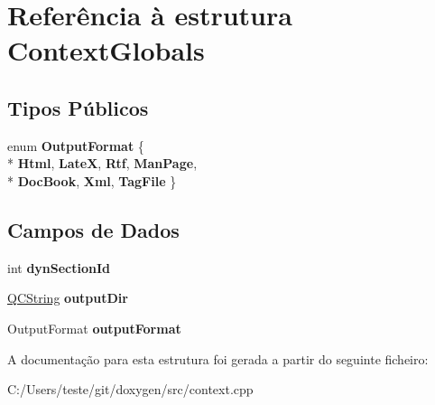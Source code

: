 \hypertarget{struct_context_globals}{\section{Referência à estrutura Context\-Globals}
\label{struct_context_globals}
}
\subsection*{Tipos Públicos}
\begin{DoxyCompactItemize}
\item 
enum {\bfseries Output\-Format} \{ \\*
{\bfseries Html}, 
{\bfseries Late\-X}, 
{\bfseries Rtf}, 
{\bfseries Man\-Page}, 
\\*
{\bfseries Doc\-Book}, 
{\bfseries Xml}, 
{\bfseries Tag\-File}
 \}
\end{DoxyCompactItemize}
\subsection*{Campos de Dados}
\begin{DoxyCompactItemize}
\item 
\hypertarget{struct_context_globals_a7cdd120bf494b891babda8587c098f6a}{int {\bfseries dyn\-Section\-Id}}\label{struct_context_globals_a7cdd120bf494b891babda8587c098f6a}

\item 
\hypertarget{struct_context_globals_a78adf7da3f3f4dd27b43938456bfd94d}{\hyperlink{class_q_c_string}{Q\-C\-String} {\bfseries output\-Dir}}\label{struct_context_globals_a78adf7da3f3f4dd27b43938456bfd94d}

\item 
\hypertarget{struct_context_globals_aaecb56ed832ccc0660e49ea16793fdbd}{Output\-Format {\bfseries output\-Format}}\label{struct_context_globals_aaecb56ed832ccc0660e49ea16793fdbd}

\end{DoxyCompactItemize}


A documentação para esta estrutura foi gerada a partir do seguinte ficheiro\-:\begin{DoxyCompactItemize}
\item 
C\-:/\-Users/teste/git/doxygen/src/context.\-cpp\end{DoxyCompactItemize}
